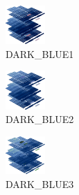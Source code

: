 \hspace{0.1cm}
\begin{minipage}[b]{0.15\linewidth}
\begin{figure}[H]                                                          
  \centering                                                             
  \begin{adjustbox}{width=1.5cm,center}                                   
  \includegraphics[width=1.5cm]{src/colorspace_colourflow/flows/colourflow_145-45.png}%
  \end{adjustbox}                                                        
\caption*{DARK\_BLUE1}                                           
\end{figure}                                                               
\end{minipage}
\hspace{0.1cm}
\begin{minipage}[b]{0.15\linewidth}
\begin{figure}[H]                                                          
  \centering                                                             
  \begin{adjustbox}{width=1.5cm,center}                                   
  \includegraphics[width=1.5cm]{src/colorspace_colourflow/flows/colourflow_146-45.png}%
  \end{adjustbox}                                                        
\caption*{DARK\_BLUE2}                                           
\end{figure}                                                               
\end{minipage}
\hspace{0.1cm}
\begin{minipage}[b]{0.15\linewidth}
\begin{figure}[H]                                                          
  \centering                                                             
  \begin{adjustbox}{width=1.5cm,center}                                   
  \includegraphics[width=1.5cm]{src/colorspace_colourflow/flows/colourflow_147-45.png}%
  \end{adjustbox}                                                        
\caption*{DARK\_BLUE3}                                           
\end{figure}                                                               
\end{minipage}
